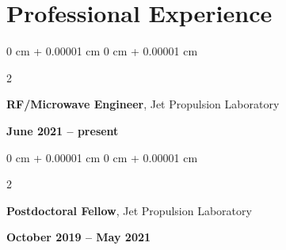 \documentclass[10pt, letterpaper]{article}
\newenvironment{highlights}{
    \begin{itemize}[
        topsep=0.10 cm,
        parsep=0.10 cm,
        partopsep=0pt,
        itemsep=0pt,
        leftmargin=0 cm + 10pt     
    ]
}{
    \end{itemize}
} %
\newenvironment{onecolentry}{
    \begin{adjustwidth}{
        0 cm + 0.00001 cm
    }{
        0 cm + 0.00001 cm
    }
}{
    \end{adjustwidth}
} %
\newenvironment{twocolentry}[2][]{
    \onecolentry
    \def\secondColumn{#2}
    \setcolumnwidth{\fill, 4.5 cm}
    \begin{paracol}{2}
}{
    \switchcolumn \raggedleft \secondColumn
    \end{paracol}
    \endonecolentry
} %
\begin{document}
        \section{Professional Experience}
        \begin{twocolentry}{
            \textbf{June 2021 – present}
        }
            \textbf{RF/Microwave Engineer}, Jet Propulsion Laboratory
        \end{twocolentry}
        \vspace{0.0 cm}


        \begin{twocolentry}{
            \textbf{October 2019 – May 2021}
        }
            \textbf{Postdoctoral Fellow}, Jet Propulsion Laboratory
        \end{twocolentry}
        \vspace{0.20 cm}
    
\end{document}
